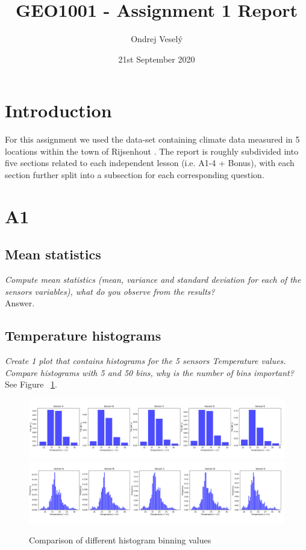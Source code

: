 \documentclass{article}
\title{GEO1001 - Assignment 1 Report}
\author{Ondrej Veselý}
\date{21st September 2020}
\begin{document}
\maketitle

\section*{Introduction}
For this assignment we used the data-set containing climate data measured in 5 locations within the town of Rijsenhout \citep{data}. The report is roughly subdivided into five sections related to each independent lesson (i.e. A1-4 + Bonus), with each section further split into a subsection for each corresponding question.


\newpage

\section{A1}

\subsection{Mean statistics}
\textit{
Compute mean statistics (mean, variance and standard deviation for each of the sensors variables), what do you observe from the results?
}\\

Answer.

\subsection{Temperature histograms}
\textit{
Create 1 plot that contains histograms for the 5 sensors Temperature values. Compare histograms with 5 and 50 bins, why is the number of bins important?
}\\

See Figure ~\ref{fig:1-2}.

\begin{figure}[!htb]
\centering
\includegraphics[width=\textwidth]{1-2-5_bins.png}
\includegraphics[width=\textwidth]{1-2-50_bins.png}
\caption{Comparison of different histogram binning values}
\label{fig:1-2}
\end{figure}
\end{document}
